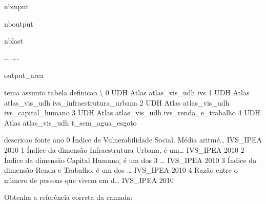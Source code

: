 \documentclass[letterpaper,10pt,brazil]{sphinxmanual}
\newlength\nbsphinxcodecellspacing
\begin{document}
\begin{sphinxuseclass}{nbinput}
{
\begin{sphinxVerbatim}[commandchars=\\\{\}]
\llap{\color{nbsphinxin}[3]:\,\hspace{\fboxrule}\hspace{\fboxsep}}   
\end{sphinxVerbatim}
}

\end{sphinxuseclass}
\begin{sphinxuseclass}{nboutput}
\begin{sphinxuseclass}{nblast}
{

\kern-\sphinxverbatimsmallskipamount\kern-\baselineskip
\kern+\FrameHeightAdjust\kern-\fboxrule
\vspace{\nbsphinxcodecellspacing}

\begin{sphinxuseclass}{output_area}
\begin{sphinxuseclass}{}


\begin{sphinxVerbatim}[commandchars=\\\{\}]
\llap{\color{nbsphinxout}[3]:\,\hspace{\fboxrule}\hspace{\fboxsep}}  tema assunto         tabela                  definicao  \textbackslash{}
0  UDH   Atlas  atlas\_vis\_udh                        ivs
1  UDH   Atlas  atlas\_vis\_udh  ivs\_infraestrutura\_urbana
2  UDH   Atlas  atlas\_vis\_udh         ivs\_capital\_humano
3  UDH   Atlas  atlas\_vis\_udh       ivs\_renda\_e\_trabalho
4  UDH   Atlas  atlas\_vis\_udh          t\_sem\_agua\_esgoto

                                           descricao     fonte   ano
0  Índice de Vulnerabilidade Social. Média aritmé{\ldots}  IVS\_IPEA  2010
1  Índice da dimensão Infraestrutura Urbana, é um{\ldots}  IVS\_IPEA  2010
2  Índice da dimensão Capital Humano, é um dos 3 {\ldots}  IVS\_IPEA  2010
3  Índice da dimensão Renda e Trabalho, é um dos {\ldots}  IVS\_IPEA  2010
4  Razão entre o número de pessoas que vivem em d{\ldots}  IVS\_IPEA  2010
\end{sphinxVerbatim}



\end{sphinxuseclass}
\end{sphinxuseclass}
}

\end{sphinxuseclass}
\end{sphinxuseclass}
\sphinxAtStartPar
Obtenha a referência correta da camada:
\end{document}
